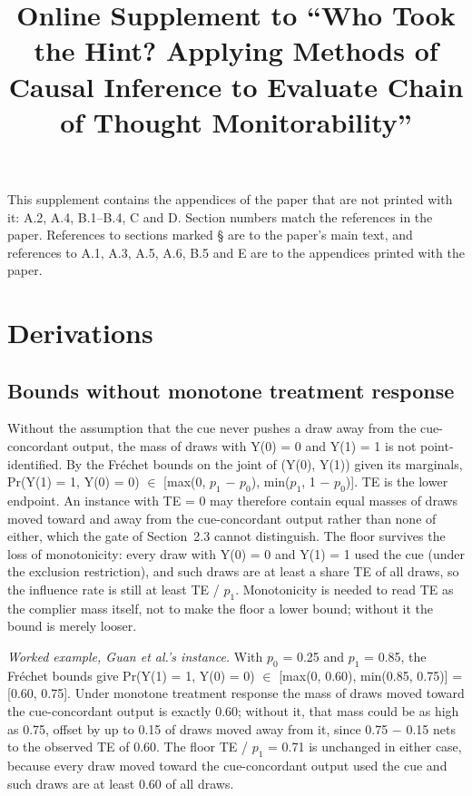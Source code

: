 \documentclass[11pt,a4paper]{article}
\title[Who Took the Hint? Online Supplement]{Online Supplement to “Who Took the Hint? Applying Methods of Causal Inference to Evaluate Chain of Thought Monitorability”}
\begin{document}
\maketitle
\noindent This supplement contains the appendices of the paper that are not printed with it: A.2, A.4, B.1--B.4, C and D. Section numbers match the references in the paper. References to sections marked \S{} are to the paper's main text, and references to A.1, A.3, A.5, A.6, B.5 and E are to the appendices printed with the paper.
\let\aesoldclearpage\clearpage\let\clearpage\relax\appendix\let\clearpage\aesoldclearpage
\setcounter{section}{0}
\section{Derivations}
\setcounter{subsection}{1}
\subsection{Bounds without monotone treatment response}
Without the assumption that the cue never pushes a draw away from the cue-concordant output, the mass of draws with Y(0) = 0 and Y(1) = 1 is not point-identified. By the Fréchet bounds on the joint of (Y(0), Y(1)) given its marginals, Pr(Y(1) = 1, Y(0) = 0) $\in$ [max(0, $p_1$ $-$ $p_0$), min($p_1$, 1 $-$ $p_0$)]. TE is the lower endpoint. An instance with TE = 0 may therefore contain equal masses of draws moved toward and away from the cue-concordant output rather than none of either, which the gate of Section~2.3 cannot distinguish. The floor survives the loss of monotonicity: every draw with Y(0) = 0 and Y(1) = 1 used the cue (under the exclusion restriction), and such draws are at least a share TE of all draws, so the influence rate is still at least TE / $p_1$. Monotonicity is needed to read TE as the complier mass itself, not to make the floor a lower bound; without it the bound is merely looser.

\emph{Worked example, Guan et al.'s instance.} With $p_0$ = 0.25 and $p_1$ = 0.85, the Fréchet bounds give Pr(Y(1) = 1, Y(0) = 0) $\in$ [max(0, 0.60), min(0.85, 0.75)] = [0.60, 0.75]. Under monotone treatment response the mass of draws moved toward the cue-concordant output is exactly 0.60; without it, that mass could be as high as 0.75, offset by up to 0.15 of draws moved away from it, since 0.75 $-$ 0.15 nets to the observed TE of 0.60. The floor TE / $p_1$ = 0.71 is unchanged in either case, because every draw moved toward the cue-concordant output used the cue and such draws are at least 0.60 of all draws.
\end{document}
